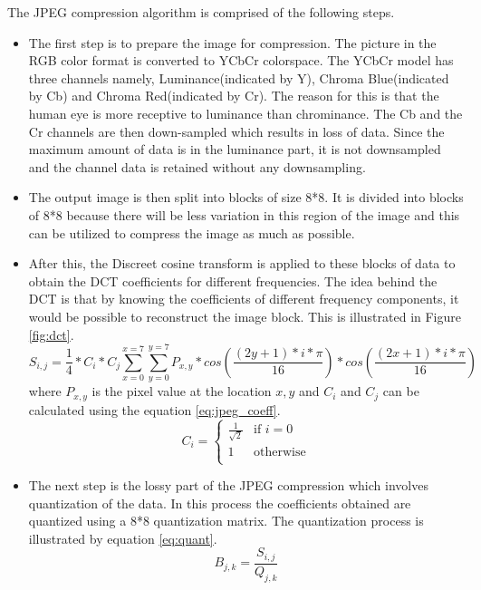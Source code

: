 The JPEG compression algorithm is comprised of the following steps.
\begin{itemize}
\item The first step is to prepare the image for compression. The picture in the RGB color format is converted to YCbCr colorspace. The YCbCr model has three channels namely, Luminance(indicated by Y), Chroma Blue(indicated by Cb) and Chroma Red(indicated by Cr). The reason for this is that the human eye is more receptive to luminance than chrominance. The Cb and the Cr channels are then down-sampled which results in loss of data. Since the maximum amount of data is in the luminance part, it is not downsampled and the channel data is retained without any downsampling. 
\item The output image is then split into blocks of size 8*8.  It is divided into blocks of 8*8 because there will be less variation in this region of the image and this can be utilized to compress the image as much as possible.
\item After this, the Discreet cosine transform is applied to these blocks of data to obtain the DCT coefficients for different frequencies. The idea behind the DCT is that by knowing the coefficients of different frequency components, it would be possible to reconstruct the image block. This is illustrated in Figure \ref{fig:dct}.
\begin{equation}
 S_{i,j} = \frac{1}{4} * C_i * C_j \sum_{x=0}^{x=7}\sum_{y=0}^{y=7}P_{x,y} *cos(\frac{(2y+1)*i*\pi}{16})*cos(\frac{(2x+1)*i*\pi}{16})
\end{equation}
where $P_{x,y}$ is the pixel value at the location $x,y$ and $C_i$ and $C_j$ can be calculated using the equation \ref{eq:jpeg_coeff}.
\begin{equation}
  C_i =
  \begin{cases}
    \frac{1}{\sqrt{2}} & \text{if $i = 0$} \\
    1 & \text{otherwise} \\
  \end{cases}
  \label{eq:jpeg_coeff}
\end{equation}
\item The next step is the lossy part of the JPEG compression which involves quantization of the data. In this process the coefficients obtained are quantized using a 8*8 quantization matrix. The quantization process is illustrated by equation \ref{eq:quant}.
\begin{equation}
B_{j,k} = \frac{S_{i,j}}{Q_{j,k}}
\label{eq:quant}
\end{equation}


\end{itemize}
